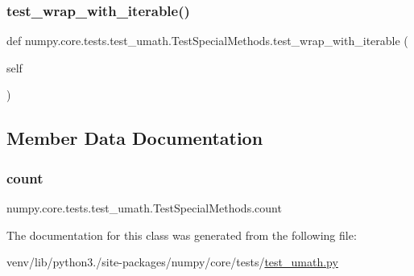 \subsubsection{\texorpdfstring{test\+\_\+wrap\+\_\+with\+\_\+iterable()}{test\_wrap\_with\_iterable()}}
{\footnotesize\ttfamily def numpy.\+core.\+tests.\+test\+\_\+umath.\+Test\+Special\+Methods.\+test\+\_\+wrap\+\_\+with\+\_\+iterable (\begin{DoxyParamCaption}\item[{}]{self }\end{DoxyParamCaption})}



\subsection{Member Data Documentation}
\mbox{\label{classnumpy_1_1core_1_1tests_1_1test__umath_1_1TestSpecialMethods_ad1a1d33b4be9cf8a4c0fbb3dddbcf4ca}} 
\subsubsection{\texorpdfstring{count}{count}}
{\footnotesize\ttfamily numpy.\+core.\+tests.\+test\+\_\+umath.\+Test\+Special\+Methods.\+count}



The documentation for this class was generated from the following file\+:\begin{DoxyCompactItemize}
\item 
venv/lib/python3./site-\/packages/numpy/core/tests/\hyperlink{test__umath_8py}{test\+\_\+umath.\+py}\end{DoxyCompactItemize}
